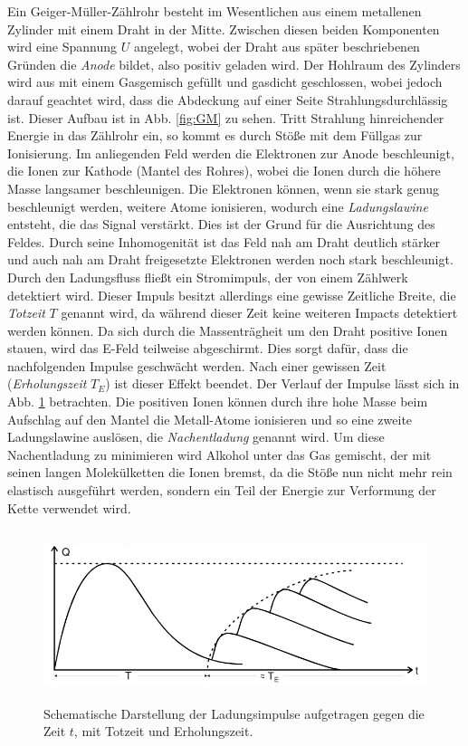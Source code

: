 Ein Geiger-Müller-Zählrohr besteht im Wesentlichen aus einem metallenen Zylinder mit einem Draht in der Mitte. Zwischen diesen beiden Komponenten wird eine Spannung $U$ angelegt, wobei der Draht aus später beschriebenen Gründen die \textit{Anode} bildet, also positiv geladen wird. Der Hohlraum des Zylinders wird aus mit einem Gasgemisch gefüllt und gasdicht geschlossen, wobei jedoch darauf geachtet wird, dass die Abdeckung auf einer Seite Strahlungsdurchlässig ist. Dieser Aufbau ist in Abb. \ref{fig:GM} zu sehen. Tritt Strahlung hinreichender Energie in das Zählrohr ein, so kommt es durch Stöße mit dem Füllgas zur Ionisierung. Im anliegenden Feld werden die Elektronen zur Anode beschleunigt, die Ionen zur Kathode (Mantel des Rohres), wobei die Ionen durch die höhere Masse langsamer beschleunigen. Die Elektronen können, wenn sie stark genug beschleunigt werden, weitere Atome ionisieren, wodurch eine \textit{Ladungslawine} entsteht, die das Signal verstärkt. Dies ist der Grund für die Ausrichtung des Feldes. Durch seine Inhomogenität ist das Feld nah am Draht deutlich stärker und auch nah am Draht freigesetzte Elektronen werden noch stark beschleunigt. Durch den Ladungsfluss fließt ein Stromimpuls, der von einem Zählwerk detektiert wird.
Dieser Impuls besitzt allerdings eine gewisse Zeitliche Breite, die \textit{Totzeit} $T$ genannt wird, da während dieser Zeit keine weiteren Impacts detektiert werden können. Da sich durch die Massenträgheit um den Draht positive Ionen stauen, wird das E-Feld teilweise abgeschirmt. Dies sorgt dafür, dass die nachfolgenden Impulse geschwächt werden. Nach einer gewissen Zeit (\textit{Erholungszeit} $T_E$) ist dieser Effekt beendet. Der Verlauf der Impulse lässt sich in Abb. \ref{fig:GM-Zeit} betrachten. Die positiven Ionen können durch ihre hohe Masse beim Aufschlag auf den Mantel die Metall-Atome ionisieren und so eine zweite Ladungslawine auslösen, die \textit{Nachentladung} genannt wird. Um  diese Nachentladung zu minimieren wird Alkohol unter das Gas gemischt, der mit seinen langen Molekülketten die Ionen bremst, da die Stöße nun nicht mehr rein elastisch ausgeführt werden, sondern ein Teil der Energie zur Verformung der Kette verwendet wird.

\begin{figure}
  \centering
  \includegraphics[height=5cm]{./logos/GM-Zeit.PNG}
  \caption{Schematische Darstellung der Ladungsimpulse aufgetragen gegen die Zeit $t$, mit Totzeit und Erholungszeit. \cite{Anleitung}}
  \label{fig:GM-Zeit}
\end{figure}

